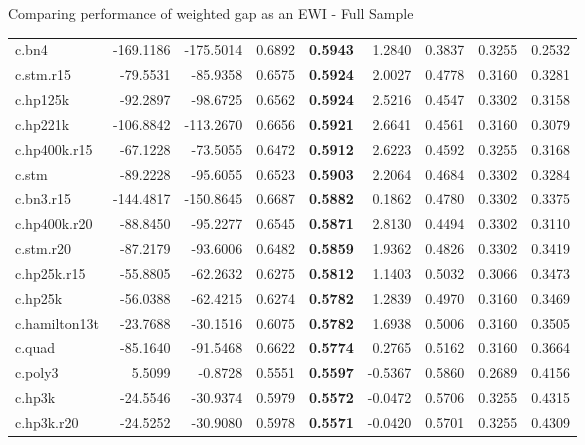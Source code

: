 \documentclass[
  ignorenonframetext,
]{beamer}
\begin{document}
\begin{frame}{Comparing performance of weighted gap as an EWI - Full
Sample}
{\begin{tabular}[t]{lrrr>{}rrrrr}
\addlinespace
c.bn4 & -169.1186 & -175.5014 & 0.6892 & \textbf{0.5943} & 1.2840 & 0.3837 & 0.3255 & 0.2532\\
c.stm.r15 & -79.5531 & -85.9358 & 0.6575 & \textbf{0.5924} & 2.0027 & 0.4778 & 0.3160 & 0.3281\\
c.hp125k & -92.2897 & -98.6725 & 0.6562 & \textbf{0.5924} & 2.5216 & 0.4547 & 0.3302 & 0.3158\\
c.hp221k & -106.8842 & -113.2670 & 0.6656 & \textbf{0.5921} & 2.6641 & 0.4561 & 0.3160 & 0.3079\\
c.hp400k.r15 & -67.1228 & -73.5055 & 0.6472 & \textbf{0.5912} & 2.6223 & 0.4592 & 0.3255 & 0.3168\\
\addlinespace
c.stm & -89.2228 & -95.6055 & 0.6523 & \textbf{0.5903} & 2.2064 & 0.4684 & 0.3302 & 0.3284\\
c.bn3.r15 & -144.4817 & -150.8645 & 0.6687 & \textbf{0.5882} & 0.1862 & 0.4780 & 0.3302 & 0.3375\\
c.hp400k.r20 & -88.8450 & -95.2277 & 0.6545 & \textbf{0.5871} & 2.8130 & 0.4494 & 0.3302 & 0.3110\\
c.stm.r20 & -87.2179 & -93.6006 & 0.6482 & \textbf{0.5859} & 1.9362 & 0.4826 & 0.3302 & 0.3419\\
c.hp25k.r15 & -55.8805 & -62.2632 & 0.6275 & \textbf{0.5812} & 1.1403 & 0.5032 & 0.3066 & 0.3473\\
\addlinespace
c.hp25k & -56.0388 & -62.4215 & 0.6274 & \textbf{0.5782} & 1.2839 & 0.4970 & 0.3160 & 0.3469\\
c.hamilton13t & -23.7688 & -30.1516 & 0.6075 & \textbf{0.5782} & 1.6938 & 0.5006 & 0.3160 & 0.3505\\
c.quad & -85.1640 & -91.5468 & 0.6622 & \textbf{0.5774} & 0.2765 & 0.5162 & 0.3160 & 0.3664\\
c.poly3 & 5.5099 & -0.8728 & 0.5551 & \textbf{0.5597} & -0.5367 & 0.5860 & 0.2689 & 0.4156\\
c.hp3k & -24.5546 & -30.9374 & 0.5979 & \textbf{0.5572} & -0.0472 & 0.5706 & 0.3255 & 0.4315\\
\addlinespace
c.hp3k.r20 & -24.5252 & -30.9080 & 0.5978 & \textbf{0.5571} & -0.0420 & 0.5701 & 0.3255 & 0.4309\\
\bottomrule
\end{tabular}}
\end{frame}
\end{document}
